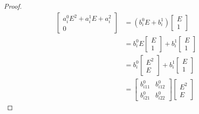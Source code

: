 \documentclass[a4paper,12pt]{article}
\begin{document}
\begin{proof}
    \begin{align*}
        \left[ {
                    \begin{array}{c}
                        a_i^0E^2+a_i^1E+a_i^2 \\
                        0
                    \end{array} } \right]
         & =
        \left(
        b_i^0E+b_i^1\right)
        \left[ {
        \begin{array}{c}
                        E \\
                        1
                    \end{array} } \right]                              \\
         & =
        b_i^0E \left[ {
                    \begin{array}{c}
                        E \\
                        1
                    \end{array} } \right] +
        b_i^1 \left[ {
        \begin{array}{c}
                        E \\
                        1
                    \end{array} } \right]                              \\
         & =
        b_i^0 \left[ {
                    \begin{array}{c}
                        E^2 \\
                        E
                    \end{array} } \right] +
        b_i^1 \left[ {
        \begin{array}{c}
                        E \\
                        1
                    \end{array} } \right]                              \\
         & =
        \left[ {
                    \begin{array}{cc}
                        b^0_{i11} & b^0_{i12} \\
                        b^0_{i21} & b^0_{i22}
                    \end{array} } \right]
        \left[ {
                    \begin{array}{c}
                        E^2 \\
                        E
                    \end{array} } \right]

\end{align*}
\end{proof}
\end{document}
